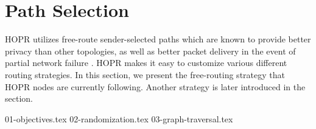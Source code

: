 \section{Path Selection}
\label{sec:path-selection}

HOPR utilizes free-route sender-selected paths which are known to provide better privacy than other topologies, as well as better packet delivery in the event of partial network failure \cite{Dingledine2004SynchronousBF}. HOPR makes it easy to customize various different routing strategies. In this section, we present the free-routing strategy that HOPR nodes are currently following. Another strategy is later introduced in the  section.

{01-objectives.tex}
{02-randomization.tex}
{03-graph-traversal.tex}
